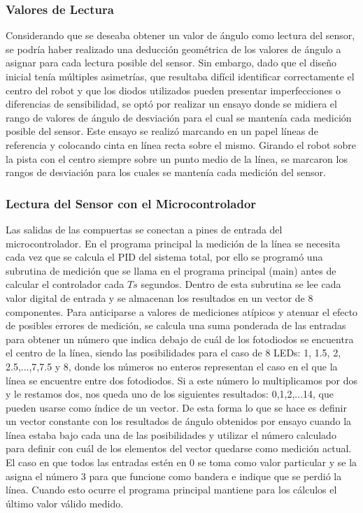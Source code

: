 \documentclass[10pt,conference,a4paper,onecolumn]{article}%
\begin{document}
\subsubsection{Valores de Lectura}
Considerando que se deseaba obtener un valor de ángulo como lectura del sensor, se podría haber realizado una deducción geométrica de los valores de ángulo a asignar para cada lectura posible del sensor. Sin embargo, dado que el diseño inicial tenía múltiples asimetrías, que resultaba difícil identificar correctamente el centro del robot y que los diodos utilizados pueden presentar imperfecciones o diferencias de sensibilidad, se optó por realizar un ensayo donde se midiera el rango de valores de ángulo de desviación para el cual se mantenía cada medición posible del sensor. Este ensayo se realizó marcando en un papel líneas de referencia y colocando cinta en línea recta sobre el mismo. Girando el robot sobre la pista con el centro siempre sobre un punto medio de la línea, se marcaron los rangos de desviación para los cuales se mantenía cada medición del sensor.
\subsubsection{Lectura del Sensor con el Microcontrolador}
Las salidas de las compuertas se conectan a pines de entrada del microcontrolador. En el programa principal la medición de la línea se necesita cada vez que se calcula el PID del sistema total, por ello se programó una subrutina de medición que se llama en el programa principal (main) antes de calcular el controlador cada $Ts$ segundos. Dentro de esta subrutina se lee cada valor digital de entrada y se almacenan los resultados en un vector de 8 componentes. Para anticiparse a valores de mediciones atípicos y atenuar el efecto de posibles errores de medición, se calcula una suma ponderada de las entradas para obtener un número que indica debajo de cuál de los fotodiodos se encuentra el centro de la línea, siendo las posibilidades para el caso de 8 LEDs: 1, 1.5, 2, 2.5,...,7,7.5 y 8, donde los números no enteros representan el caso en el que la línea se encuentre entre dos fotodiodos. Si a este número lo multiplicamos por dos y le restamos dos, nos queda uno de los siguientes resultados: 0,1,2,...14, que pueden usarse como índice de un vector. De esta forma lo que se hace es definir un vector constante con los resultados de ángulo obtenidos por ensayo cuando la línea estaba bajo cada una de las posibilidades y utilizar el número calculado para definir con cuál de los elementos del vector quedarse como medición actual. El caso en que todos
las entradas estén en 0 se toma como valor particular y se la asigna el número 3 para que funcione como bandera e indique que se perdió la línea. Cuando esto ocurre el programa principal mantiene para los cálculos el último valor válido medido.
\end{document}
